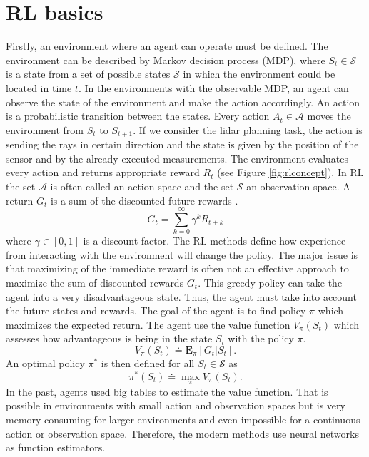 \section{RL basics}
Firstly, an environment where an agent can operate must be defined. The environment can be described by Markov decision process (MDP), where $S_t \in \mathcal{S}$ is a state from a set of possible states $\mathcal{S}$ in which the environment could be located in time $t$. In the environments with the observable MDP, an agent can observe the state of the environment and make the action accordingly. An action is a probabilistic transition between the states. Every action $A_t \in \mathcal{A}$ moves the environment from $S_t$ to $S_{t+1}$. If we consider the lidar planning task, the action is sending the rays in certain direction and the state is given by the position of the sensor and by the already executed measurements. The environment evaluates every action and returns appropriate reward $R_t$ (see Figure \ref{fig:rlconcept}). In RL the set $\mathcal{A}$ is often called an action space and the set $\mathcal{S}$ an observation space. A return $G_t$ is a sum of the discounted future rewards \cite{sutton2012}.
\begin{equation}
G_t = \sum\limits_{k=0}^{\infty}\gamma^k R_{t+k}
\end{equation}
where $\gamma \in [0,1]$ is a discount factor. The RL methods define how experience from interacting with the environment will change the policy. The major issue is that maximizing of the immediate reward is often not an effective approach to maximize the sum of discounted rewards $G_t$. This greedy policy can take the agent into a very disadvantageous state. Thus, the agent must take into account the future states and rewards. The goal of the agent is to find policy $\pi$ which maximizes the expected return. The agent use the value function $V_{\pi}(S_t)$ which assesses how advantageous is being in the state $S_t$ with the policy $\pi$.
\begin{equation}
V_{\pi}(S_t) \doteq  \mathbf{E}_\pi[G_t | S_t].
\end{equation}
An optimal policy $\pi^*$ is then defined for all $S_t \in \mathcal{S}$ as
\begin{equation}
\pi^*(S_t) \doteq \max\limits_\pi V_\pi(S_t).
\end{equation}
In the past, agents used big tables to estimate the value function. That is possible in environments with small action and observation spaces but is very memory consuming for larger environments and even impossible for a continuous action or observation space. Therefore, the modern methods use neural networks as function estimators.

